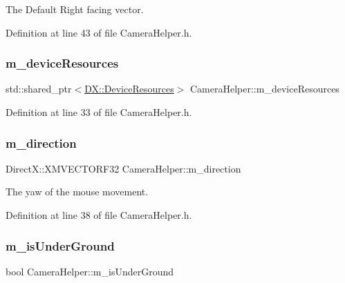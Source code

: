 The Default Right facing vector. 



Definition at line 43 of file Camera\+Helper.\+h.

\mbox{\label{class_camera_helper_a68562f65262d3c90532df0a194624ec9}} 
\subsubsection{\texorpdfstring{m\+\_\+device\+Resources}{m\_deviceResources}}
{\footnotesize\ttfamily std\+::shared\+\_\+ptr$<$\mbox{\hyperlink{class_d_x_1_1_device_resources}{D\+X\+::\+Device\+Resources}}$>$ Camera\+Helper\+::m\+\_\+device\+Resources\hspace{0.3cm}{\ttfamily [private]}}



Definition at line 33 of file Camera\+Helper.\+h.

\mbox{\label{class_camera_helper_af2822e6b05e48f33100c2f678e3776ce}} 
\subsubsection{\texorpdfstring{m\+\_\+direction}{m\_direction}}
{\footnotesize\ttfamily Direct\+X\+::\+X\+M\+V\+E\+C\+T\+O\+R\+F32 Camera\+Helper\+::m\+\_\+direction\hspace{0.3cm}{\ttfamily [private]}}



The yaw of the mouse movement. 



Definition at line 38 of file Camera\+Helper.\+h.

\mbox{\label{class_camera_helper_a58fe7fb37f0bda549c7a8cc59fb58042}} 
\subsubsection{\texorpdfstring{m\+\_\+is\+Under\+Ground}{m\_isUnderGround}}
{\footnotesize\ttfamily bool Camera\+Helper\+::m\+\_\+is\+Under\+Ground\hspace{0.3cm}{\ttfamily [private]}}



